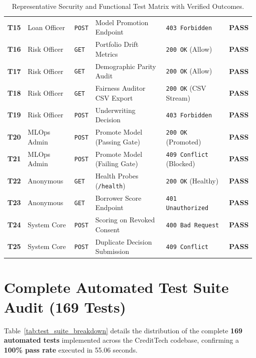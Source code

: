 \documentclass[11pt,a4paper,oneside]{report}
\begin{document}
\begin{table}[H]
\begin{tabularx}{\textwidth}{l p{2.2cm} p{1.6cm} p{3.2cm} p{2.4cm} c}
  \textbf{T15} & Loan Officer & \texttt{POST} & Model Promotion Endpoint & \texttt{403 Forbidden} & \textbf{PASS} \\
  \addlinespace
  \textbf{T16} & Risk Officer & \texttt{GET} & Portfolio Drift Metrics & \texttt{200 OK} (Allow) & \textbf{PASS} \\
  \textbf{T17} & Risk Officer & \texttt{GET} & Demographic Parity Audit & \texttt{200 OK} (Allow) & \textbf{PASS} \\
  \textbf{T18} & Risk Officer & \texttt{GET} & Fairness Auditor CSV Export & \texttt{200 OK} (CSV Stream) & \textbf{PASS} \\
  \textbf{T19} & Risk Officer & \texttt{POST} & Underwriting Decision & \texttt{403 Forbidden} & \textbf{PASS} \\
  \addlinespace
  \textbf{T20} & MLOps Admin & \texttt{POST} & Promote Model (Passing Gate) & \texttt{200 OK} (Promoted) & \textbf{PASS} \\
  \textbf{T21} & MLOps Admin & \texttt{POST} & Promote Model (Failing Gate) & \texttt{409 Conflict} (Blocked)& \textbf{PASS} \\
  \textbf{T22} & Anonymous & \texttt{GET} & Health Probes (\texttt{/health}) & \texttt{200 OK} (Healthy) & \textbf{PASS} \\
  \textbf{T23} & Anonymous & \texttt{GET} & Borrower Score Endpoint & \texttt{401 Unauthorized} & \textbf{PASS} \\
  \textbf{T24} & System Core & \texttt{POST} & Scoring on Revoked Consent & \texttt{400 Bad Request} & \textbf{PASS} \\
  \textbf{T25} & System Core & \texttt{POST} & Duplicate Decision Submission & \texttt{409 Conflict} & \textbf{PASS} \\
  \bottomrule
\end{tabularx}
\caption{Representative Security and Functional Test Matrix with Verified Outcomes.}
\label{tab:test_cases_matrix}
\end{table}

\section{Complete Automated Test Suite Audit (169 Tests)}
Table~\ref{tab:test_suite_breakdown} details the distribution of the complete \textbf{169 automated tests} implemented across the CreditTech codebase, confirming a \textbf{100\% pass rate} executed in 55.06 seconds.
\end{document}
